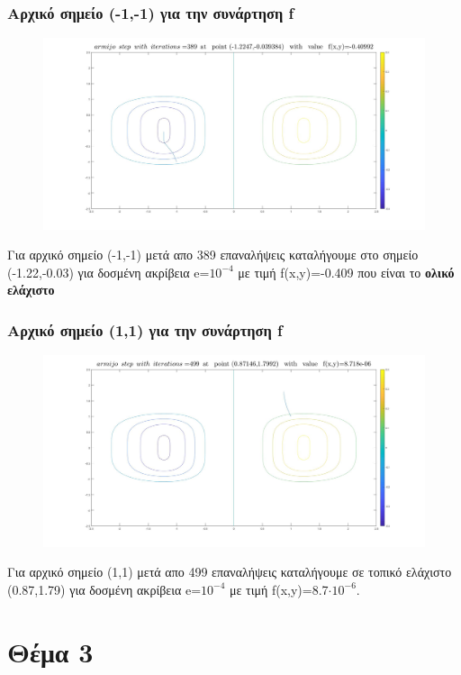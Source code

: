 \documentclass{article}
\begin{document}
\subsubsection*{Αρχικό σημείο (-1,-1) για την συνάρτηση f}
\begin{figure}[h!]	
     \centering  
     \advance\leftskip-0.2cm  
  \includegraphics[width=130mm,scale=2]{arm2.jpg}
\end{figure} 
Για αρχικό σημείο (-1,-1) μετά απο 389 επαναλήψεις καταλήγουμε στο σημείο (-1.22,-0.03) για  δοσμένη ακρίβεια e=$10^{-4}$ με τιμή f(x,y)=-0.409 που είναι  το \textbf{ολικό ελάχιστο}
\clearpage
\subsubsection*{Αρχικό σημείο (1,1) για την συνάρτηση f}
\begin{figure}[h!]	
     \centering  
     \advance\leftskip-0.2cm  
  \includegraphics[width=130mm,scale=2]{arm3.jpg}
\end{figure} 
Για αρχικό σημείο (1,1) μετά απο 499 επαναλήψεις καταλήγουμε σε τοπικό ελάχιστο (0.87,1.79) για δοσμένη ακρίβεια e=$10^{-4}$ με τιμή f(x,y)=8.7$\cdot 10^{-6}$. 
\newpage
\section*{Θέμα 3}
\end{document}
